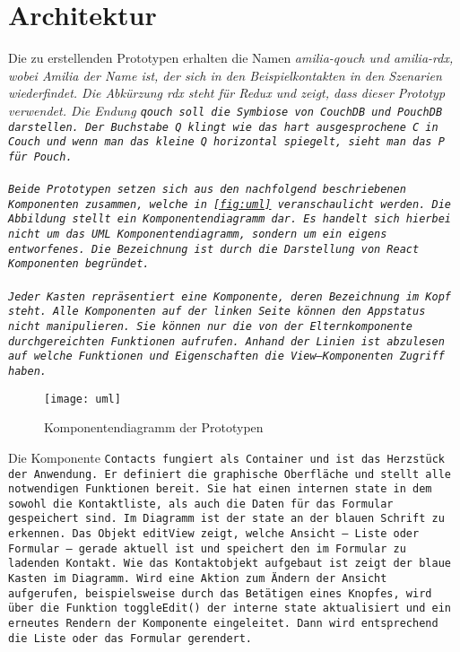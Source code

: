 \section{Architektur}
Die zu erstellenden Prototypen erhalten die Namen \it{amilia-qouch} und \it{amilia-rdx}, wobei Amilia der Name ist, der sich in den Beispielkontakten in den Szenarien wiederfindet. Die Abkürzung \it{rdx} steht für Redux und zeigt, dass dieser Prototyp  verwendet. Die Endung \tt{qouch} soll die Symbiose von CouchDB und PouchDB darstellen. Der Buchstabe Q klingt wie das hart ausgesprochene C in Couch und wenn man das kleine Q horizontal spiegelt, sieht man das P für Pouch.\\\\
Beide Prototypen setzen sich aus den nachfolgend beschriebenen Komponenten zusammen, welche in \autoref{fig:uml} veranschaulicht werden. Die Abbildung stellt ein Komponentendiagramm dar. Es handelt sich hierbei nicht um das UML Komponentendiagramm, sondern um ein eigens entworfenes. Die Bezeichnung ist durch die Darstellung von React Komponenten begründet.\\\\
Jeder Kasten repräsentiert eine Komponente, deren Bezeichnung im Kopf steht.
Alle Komponenten auf der linken Seite können den Appstatus nicht manipulieren. Sie können nur die von der Elternkomponente durchgereichten Funktionen aufrufen. Anhand der Linien ist abzulesen auf welche Funktionen und Eigenschaften die View--Komponenten Zugriff haben.
%
\begin{figure}[H]
  \centering
  \texttt{[image: uml]}
  \grayRule
  \caption[Komponentendiagramm]{Komponentendiagramm der Prototypen}
  \label{fig:uml}
\end{figure}
%
Die Komponente \tt{Contacts} fungiert als Container und ist das Herzstück der Anwendung. Er definiert die graphische Oberfläche und stellt alle notwendigen Funktionen bereit. Sie hat einen internen \tt{state} in dem sowohl die Kontaktliste, als auch die Daten für das Formular gespeichert sind. Im Diagramm ist der \tt{state} an der blauen Schrift zu erkennen.
Das Objekt \tt{editView} zeigt, welche Ansicht -- Liste oder Formular -- gerade aktuell ist und speichert den im Formular zu ladenden Kontakt.
Wie das Kontaktobjekt aufgebaut ist zeigt der blaue Kasten im Diagramm.
Wird eine Aktion zum Ändern der Ansicht aufgerufen, beispielsweise durch das Betätigen eines Knopfes, wird über die Funktion \tt{toggleEdit()} der interne \tt{state} aktualisiert und ein erneutes Rendern der Komponente eingeleitet. Dann wird entsprechend die Liste oder das Formular gerendert.\\
